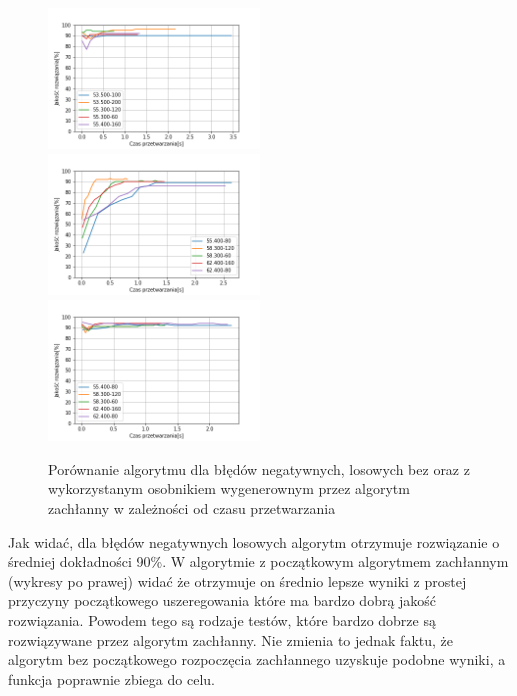 \documentclass{article}
\begin{document}
\begin{figure}[H]
\includegraphics[width=0.5\textwidth]{Czasneg-los-greedy3.png}
\includegraphics[width=0.5\textwidth]{Czasneg-los4.png}
\includegraphics[width=0.5\textwidth]{Czasneg-los-greedy4.png}
\caption{Porównanie algorytmu dla błędów negatywnych, losowych bez oraz z wykorzystanym osobnikiem wygenerownym przez algorytm zachłanny w zależności od czasu przetwarzania}
\end{figure}
Jak widać, dla błędów negatywnych losowych algorytm otrzymuje rozwiązanie o średniej dokładności 90\%. W algorytmie z początkowym algorytmem zachłannym (wykresy po prawej) widać że otrzymuje on średnio lepsze wyniki z prostej przyczyny początkowego uszeregowania które ma bardzo dobrą jakość rozwiązania. Powodem tego są rodzaje testów, które bardzo dobrze są rozwiązywane przez algorytm zachłanny. Nie zmienia to jednak faktu, że algorytm bez początkowego rozpoczęcia zachłannego uzyskuje podobne wyniki, a funkcja poprawnie zbiega do celu.
\end{document}
